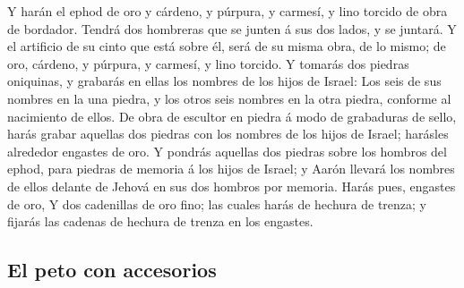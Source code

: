  Y harán el ephod de oro y cárdeno, y púrpura, y carmesí, y
lino torcido de obra de bordador.  Tendrá dos hombreras que
se junten á sus dos lados, y se juntará.  Y el artificio de
su cinto que está sobre él, será de su misma obra, de lo mismo; de oro,
cárdeno, y púrpura, y carmesí, y lino torcido.  Y tomarás
dos piedras oniquinas, y grabarás en ellas los nombres de los hijos de
Israel:  Los seis de sus nombres en la una piedra, y los
otros seis nombres en la otra piedra, conforme al nacimiento de ellos.
 De obra de escultor en piedra á modo de grabaduras de
sello, harás grabar aquellas dos piedras con los nombres de los hijos de
Israel; harásles alrededor engastes de oro.  Y pondrás
aquellas dos piedras sobre los hombros del ephod, para piedras de
memoria á los hijos de Israel; y Aarón llevará los nombres de ellos
delante de Jehová en sus dos hombros por memoria.  Harás
pues, engastes de oro,  Y dos cadenillas de oro fino; las
cuales harás de hechura de trenza; y fijarás las cadenas de hechura de
trenza en los engastes.

\hypertarget{el-peto-con-accesorios}{%
\subsection{El peto con accesorios}\label{el-peto-con-accesorios}}


